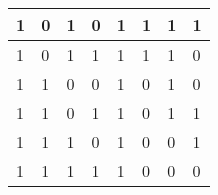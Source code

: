 \documentclass[11pt]{article}
\begin{document}
\begin{table}[H]
\begin{tabular}{|llll|llll|}
	\multicolumn{1}{|l|}{1} & \multicolumn{1}{l|}{0} & \multicolumn{1}{l|}{1} & 0 & \multicolumn{1}{l|}{1} & \multicolumn{1}{l|}{1} & \multicolumn{1}{l|}{1} & 1 \\ \hline
	\multicolumn{1}{|l|}{1} & \multicolumn{1}{l|}{0} & \multicolumn{1}{l|}{1} & 1 & \multicolumn{1}{l|}{1} & \multicolumn{1}{l|}{1} & \multicolumn{1}{l|}{1} & 0 \\ \hline
	\multicolumn{1}{|l|}{1} & \multicolumn{1}{l|}{1} & \multicolumn{1}{l|}{0} & 0 & \multicolumn{1}{l|}{1} & \multicolumn{1}{l|}{0} & \multicolumn{1}{l|}{1} & 0 \\ \hline
	\multicolumn{1}{|l|}{1} & \multicolumn{1}{l|}{1} & \multicolumn{1}{l|}{0} & 1 & \multicolumn{1}{l|}{1} & \multicolumn{1}{l|}{0} & \multicolumn{1}{l|}{1} & 1 \\ \hline
	\multicolumn{1}{|l|}{1} & \multicolumn{1}{l|}{1} & \multicolumn{1}{l|}{1} & 0 & \multicolumn{1}{l|}{1} & \multicolumn{1}{l|}{0} & \multicolumn{1}{l|}{0} & 1 \\ \hline
	\multicolumn{1}{|l|}{1} & \multicolumn{1}{l|}{1} & \multicolumn{1}{l|}{1} & 1 & \multicolumn{1}{l|}{1} & \multicolumn{1}{l|}{0} & \multicolumn{1}{l|}{0} & 0 \\ \hline
	\end{tabular}
	\end{table}
\end{document}
